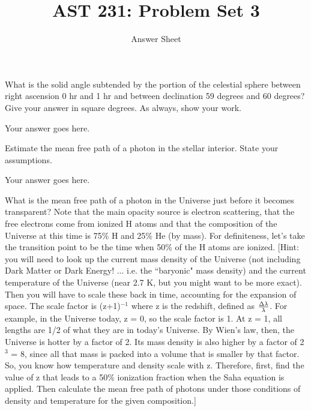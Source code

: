\documentclass[12pt]{article}
\newenvironment{problem}[2][Problem]{\begin{trivlist}
\item[\hskip \labelsep {\bfseries #1}\hskip \labelsep {\bfseries #2.}]}{\end{trivlist}}
\newenvironment{answer}[2][Answer]{\begin{trivlist}
\item[\hskip \labelsep {\bfseries #1}\hskip \labelsep {\bfseries #2.}]}{\end{trivlist}}
\begin{document}
 
 
\title{AST 231: Problem Set 3}
\author{Answer Sheet}
\maketitle
 
\begin{problem}{1}
What is the solid angle subtended by the portion of the celestial sphere between right ascension 0 hr and 1 hr and between declination 59 degrees and 60 degrees? Give your answer in square degrees. As always, show your work.
\end{problem}

\begin{answer}{1}
Your answer goes here. 
\end{answer}

\begin{problem}{2}

Estimate the mean free path of a photon in the stellar interior. State your assumptions. 

\end{problem}

\begin{answer}{2}
Your answer goes here. 
\end{answer}

\begin{problem}{3}
What is the mean free path of a photon in the Universe just before it becomes transparent? Note that the main opacity source is electron scattering, that the free electrons come from ionized H atoms and that the composition of the Universe at this time is 75\% H and 25\% He (by mass). For definiteness, let's take the transition point to be the time when 50\% of the H atoms are ionized. [Hint: you will need to look up the current mass density of the Universe (not including Dark Matter or Dark Energy! ... i.e. the ``baryonic" mass density) and the current temperature of the Universe (near 2.7 K, but you might want to be more exact). Then you will have to scale these back in time, accounting for the expansion of space. The scale factor is (z+1)$^{-1}$ where z is the redshift, defined as $\Delta \lambda \over \lambda$. For example, in the Universe today, z = 0, so the scale factor is 1. At z = 1, all lengths are 1/2 of what they are in today's Universe. By Wien's law, then, the Universe is hotter by a factor of 2. Its mass density is also higher by a factor of 2$^3$ = 8, since all that mass is packed into a volume that is smaller by that factor. So, you know how temperature and density scale with z. Therefore, first, find the value of z that leads to a 50\% ionization fraction when the Saha equation is applied. Then calculate the mean free path of photons under those conditions of density and temperature for the given composition.]

\end{problem}
\end{document}
